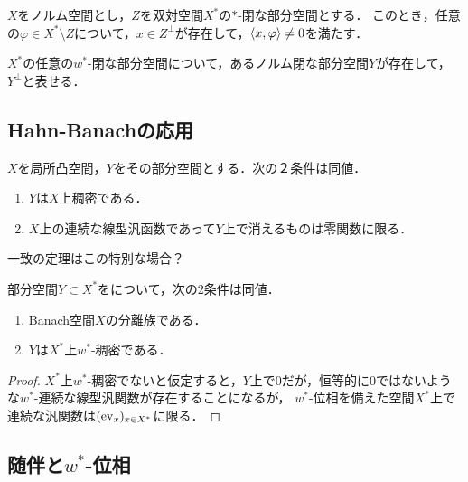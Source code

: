 \documentclass[uplatex,dvipdfmx]{jsreport}
\begin{document}
\begin{proposition}[$w^*$-閉な部分空間の表現]
    $X$をノルム空間とし，$Z$を双対空間$X^*$の$*$-閉な部分空間とする．
    このとき，任意の$\varphi\in X^*\setminus Z$について，$x\in Z^\perp$が存在して，$\langle x,\varphi\rangle\ne 0$を満たす．
\end{proposition}

\begin{corollary}
    $X^*$の任意の$w^*$-閉な部分空間について，あるノルム閉な部分空間$Y$が存在して，$Y^\perp$と表せる．
\end{corollary}

\subsection{Hahn-Banachの応用}

\begin{corollary}
    $X$を局所凸空間，$Y$をその部分空間とする．次の２条件は同値．
    \begin{enumerate}
        \item $Y$は$X$上稠密である．
        \item $X$上の連続な線型汎函数であって$Y$上で消えるものは零関数に限る．
    \end{enumerate}
\end{corollary}
\begin{remarks}
    一致の定理はこの特別な場合？
\end{remarks}

\begin{corollary}[双対空間の稠密部分空間の特徴付け]\label{cor-separating-subspace-is-dense}
    部分空間$Y\subset X^*$をについて，次の2条件は同値．
    \begin{enumerate}
        \item Banach空間$X$の分離族である．
        \item $Y$は$X^*$上$w^*$-稠密である．
    \end{enumerate}
\end{corollary}
\begin{proof}
    $X^*$上$w^*$-稠密でないと仮定すると，$Y$上で$0$だが，恒等的に$0$ではないような$w^*$-連続な線型汎関数が存在することになるが，
    $w^*$-位相を備えた空間$X^*$上で連続な汎関数は$(\mathrm{ev}_x)_{x\in X^*}$に限る．
\end{proof}

\subsection{随伴と$w^*$-位相}
\end{document}
